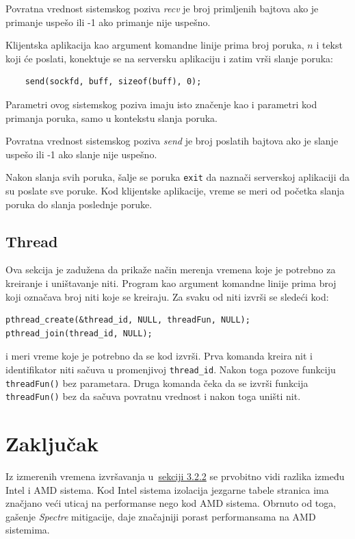 \documentclass[12pt]{report}
\begin{document}
Povratna vrednost sistemskog poziva \textit{recv} je broj primljenih bajtova ako je primanje uspešo ili -1 ako primanje nije uspešno.

Klijentska aplikacija kao argument komandne linije prima broj poruka, $ n $ i tekst koji će poslati, konektuje se na serversku aplikaciju i zatim vrši slanje poruka:

\begin{verbatim}
    send(sockfd, buff, sizeof(buff), 0);
\end{verbatim}

Parametri ovog sistemskog poziva imaju isto značenje kao i parametri kod primanja poruka, samo u kontekstu slanja poruka.

Povratna vrednost sistemskog poziva \textit{send} je broj poslatih bajtova ako je slanje uspešo ili -1 ako slanje nije uspešno.

Nakon slanja svih poruka, šalje se poruka \texttt{exit} da naznači serverskoj aplikaciji da su poslate sve poruke. Kod klijentske aplikacije, vreme se meri od početka slanja poruka do slanja poslednje poruke.

\section{Thread}
Ova sekcija je zadužena da prikaže način merenja vremena koje je potrebno za kreiranje i uništavanje niti. Program kao argument komandne linije prima broj koji označava broj niti koje se kreiraju. Za svaku od niti izvrši se sledeći kod:
\begin{verbatim}
pthread_create(&thread_id, NULL, threadFun, NULL);
pthread_join(thread_id, NULL);
\end{verbatim}
i meri vreme koje je potrebno da se kod izvrši. Prva komanda kreira nit i identifikator niti sačuva u promenjivoj \texttt{thread\_id}. Nakon toga pozove funkciju \texttt{threadFun()} bez parametara. Druga komanda čeka da se izvrši funkcija \texttt{threadFun()} bez da sačuva povratnu vrednost i nakon toga uništi nit.

\chapter{Zaključak}
Iz izmerenih vremena izvršavanja u~\hyperref[benchmark]{sekciji 3.2.2} se prvobitno vidi razlika između Intel i AMD sistema. Kod Intel sistema izolacija jezgarne tabele stranica ima značjano veći uticaj na performanse nego kod AMD sistema. Obrnuto od toga, gašenje \textit{Spectre} mitigacije, daje značajniji porast performansama na AMD sistemima.
\end{document}

